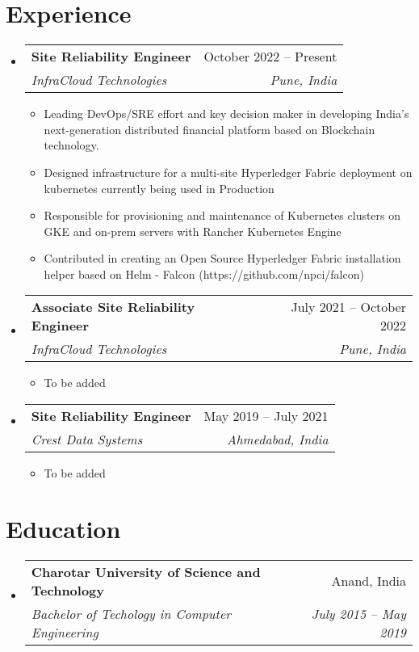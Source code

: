 \documentclass[letterpaper,11pt]{article}
\makeatletter
\newcommand{\resumeItem}[1]{
  \item\small{
    {#1 \vspace{-2pt}}
  }
}
\newcommand{\resumeSubheading}[4]{
  \vspace{-2pt}\item
    \begin{tabular*}{0.97\textwidth}[t]{l@{\extracolsep{\fill}}r}
      \textbf{#1} & #2 \\
      \textit{\small#3} & \textit{\small #4} \\
    \end{tabular*}\vspace{-7pt}
}
\newcommand{\resumeSubSubheading}[2]{
    \item
    \begin{tabular*}{0.97\textwidth}{l@{\extracolsep{\fill}}r}
      \textit{\small#1} & \textit{\small #2} \\
    \end{tabular*}\vspace{-7pt}
}
\newcommand{\resumeSubHeadingListStart}{\begin{itemize}[leftmargin=0.15in, label={}]}
\newcommand{\resumeSubHeadingListEnd}{\end{itemize}}
\newcommand{\resumeItemListStart}{\begin{itemize}}
\newcommand{\resumeItemListEnd}{\end{itemize}\vspace{-5pt}}
\makeatother
\begin{document}
\section{Experience}
  \resumeSubHeadingListStart

    \resumeSubheading
      {Site Reliability Engineer}{October 2022 -- Present}
      {InfraCloud Technologies}{Pune, India}
      \resumeItemListStart
        \resumeItem{Leading DevOps/SRE effort and key decision maker in developing India's next-generation distributed financial platform based on Blockchain technology.}
        \resumeItem{Designed infrastructure for a multi-site Hyperledger Fabric deployment on kubernetes currently being used in Production}
        \resumeItem{Responsible for provisioning and maintenance of Kubernetes clusters on GKE and on-prem servers with Rancher Kubernetes Engine}
        \resumeItem{Contributed in creating an Open Source Hyperledger Fabric installation helper based on Helm - Falcon (https://github.com/npci/falcon)}
      \resumeItemListEnd
      

    \resumeSubheading
      {Associate Site Reliability Engineer}{July 2021 -- October 2022}
      {InfraCloud Technologies}{Pune, India}
      \resumeItemListStart
        \resumeItem{To be added}
    \resumeItemListEnd

    \resumeSubheading
      {Site Reliability Engineer}{May 2019 -- July 2021}
      {Crest Data Systems}{Ahmedabad, India}
      \resumeItemListStart
        \resumeItem{To be added}
      \resumeItemListEnd

  \resumeSubHeadingListEnd


\section{Education}
  \resumeSubHeadingListStart
    \resumeSubheading
      {Charotar University of Science and Technology}{Anand, India}
      {Bachelor of Techology in Computer Engineering}{July 2015 -- May 2019}
  \resumeSubHeadingListEnd

\end{document}
